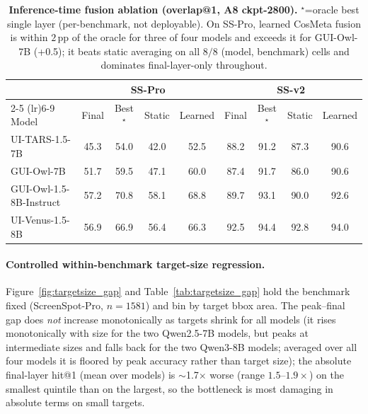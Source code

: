 \begin{table}[!htbp]
\centering\footnotesize\renewcommand{\arraystretch}{0.85}\setlength{\tabcolsep}{3pt}
\begin{tabular}{lcccccccc}
\toprule
& \multicolumn{4}{c}{SS-Pro} & \multicolumn{4}{c}{SS-v2} \\
\cmidrule(lr){2-5} \cmidrule(lr){6-9}
Model & Final & Best$^\star$ & Static & Learned & Final & Best$^\star$ & Static & Learned \\
\midrule
UI-TARS-1.5-7B & 45.3 & 54.0 & 42.0 & 52.5 & 88.2 & 91.2 & 87.3 & 90.6\\
GUI-Owl-7B & 51.7 & 59.5 & 47.1 & 60.0 & 87.4 & 91.7 & 86.0 & 90.6\\
GUI-Owl-1.5-8B-Instruct & 57.2 & 70.8 & 58.1 & 68.8 & 89.7 & 93.1 & 90.0 & 92.6\\
UI-Venus-1.5-8B & 56.9 & 66.9 & 56.4 & 66.3 & 92.5 & 94.4 & 92.8 & 94.0\\
\bottomrule
\end{tabular}
\caption{\textbf{Inference-time fusion ablation (overlap@1, A8 ckpt-2800).} $^\star$=oracle best single layer (per-benchmark, not deployable). On SS-Pro, learned CosMeta fusion is within $2$\,pp of the oracle for three of four models and exceeds it for GUI-Owl-7B (+0.5); it beats static averaging on all $8/8$ (model, benchmark) cells and dominates final-layer-only throughout.}
\label{tab:fusion_ablation}
\end{table}

\paragraph{Controlled within-benchmark target-size regression.}
Figure~\ref{fig:targetsize_gap} and Table~\ref{tab:targetsize_gap} hold the
benchmark fixed (ScreenSpot-Pro, $n{=}1581$) and bin by target bbox area. The
peak--final gap does \emph{not} increase monotonically as targets shrink for all models
(it rises monotonically with size for the two Qwen2.5-7B models, but peaks at
intermediate sizes and falls back for the two Qwen3-8B models; averaged over all
four models it is floored by peak accuracy rather than target size); the absolute
final-layer hit@1 (mean over models) is $\sim$1.7$\times$ worse (range $1.5$--$1.9\times$)
on the smallest quintile than on the largest, so the bottleneck is most damaging
in absolute terms on small targets.

